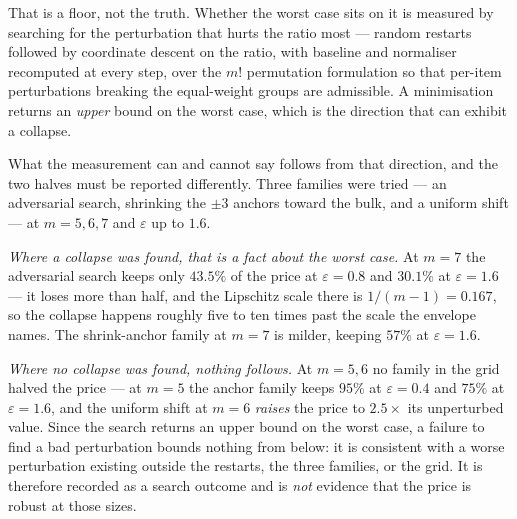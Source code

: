 That is a floor, not the truth. Whether the worst case sits on it is measured by searching
for the perturbation that hurts the ratio most --- random restarts followed by coordinate
descent on the ratio, with baseline and normaliser recomputed at every step, over the
$m!$ permutation formulation so that per-item perturbations breaking the equal-weight
groups are admissible. A minimisation returns an \emph{upper} bound on the worst case,
which is the direction that can exhibit a collapse. \NUM{}

What the measurement can and cannot say follows from that direction, and the two halves
must be reported differently. Three families were tried --- an adversarial search,
shrinking the $\pm3$ anchors toward the bulk, and a uniform shift --- at $m=5,6,7$ and
$\varepsilon$ up to $1.6$.

\emph{Where a collapse was found, that is a fact about the worst case.} At $m=7$ the
adversarial search keeps only $43.5\%$ of the price at $\varepsilon=0.8$ and $30.1\%$ at
$\varepsilon=1.6$ --- it loses more than half, and the Lipschitz scale there is
$1/(m-1)=0.167$, so the collapse happens roughly five to ten times past the scale the
envelope names. The shrink-anchor family at $m=7$ is milder, keeping $57\%$ at
$\varepsilon=1.6$. \NUM{}

\emph{Where no collapse was found, nothing follows.} At $m=5,6$ no family in the grid
halved the price --- at $m=5$ the anchor family keeps $95\%$ at $\varepsilon=0.4$ and
$75\%$ at $\varepsilon=1.6$, and the uniform shift at $m=6$ \emph{raises} the price to
$2.5\times$ its unperturbed value. Since the search returns an upper bound on the worst
case, a failure to find a bad perturbation bounds nothing from below: it is consistent with
a worse perturbation existing outside the restarts, the three families, or the grid. It is
therefore recorded as a search outcome and is \emph{not} evidence that the price is robust
at those sizes. \NUM{}


